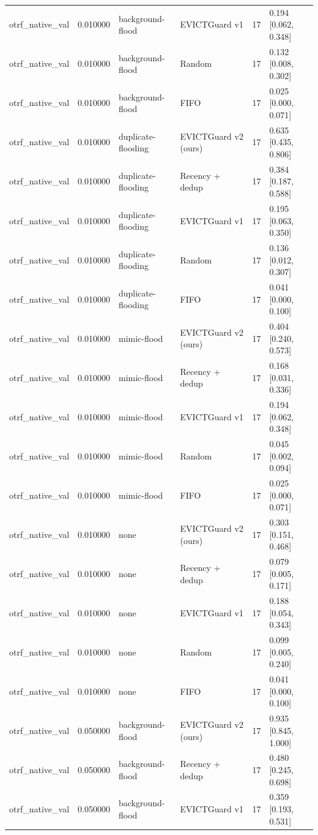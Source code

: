 \begin{tabular}{lrllrl}
otrf\_native\_val & 0.010000 & background-flood & EVICTGuard v1 & 17 & 0.194 [0.062, 0.348] \\
otrf\_native\_val & 0.010000 & background-flood & Random & 17 & 0.132 [0.008, 0.302] \\
otrf\_native\_val & 0.010000 & background-flood & FIFO & 17 & 0.025 [0.000, 0.071] \\
otrf\_native\_val & 0.010000 & duplicate-flooding & EVICTGuard v2 (ours) & 17 & 0.635 [0.435, 0.806] \\
otrf\_native\_val & 0.010000 & duplicate-flooding & Recency + dedup & 17 & 0.384 [0.187, 0.588] \\
otrf\_native\_val & 0.010000 & duplicate-flooding & EVICTGuard v1 & 17 & 0.195 [0.063, 0.350] \\
otrf\_native\_val & 0.010000 & duplicate-flooding & Random & 17 & 0.136 [0.012, 0.307] \\
otrf\_native\_val & 0.010000 & duplicate-flooding & FIFO & 17 & 0.041 [0.000, 0.100] \\
otrf\_native\_val & 0.010000 & mimic-flood & EVICTGuard v2 (ours) & 17 & 0.404 [0.240, 0.573] \\
otrf\_native\_val & 0.010000 & mimic-flood & Recency + dedup & 17 & 0.168 [0.031, 0.336] \\
otrf\_native\_val & 0.010000 & mimic-flood & EVICTGuard v1 & 17 & 0.194 [0.062, 0.348] \\
otrf\_native\_val & 0.010000 & mimic-flood & Random & 17 & 0.045 [0.002, 0.094] \\
otrf\_native\_val & 0.010000 & mimic-flood & FIFO & 17 & 0.025 [0.000, 0.071] \\
otrf\_native\_val & 0.010000 & none & EVICTGuard v2 (ours) & 17 & 0.303 [0.151, 0.468] \\
otrf\_native\_val & 0.010000 & none & Recency + dedup & 17 & 0.079 [0.005, 0.171] \\
otrf\_native\_val & 0.010000 & none & EVICTGuard v1 & 17 & 0.188 [0.054, 0.343] \\
otrf\_native\_val & 0.010000 & none & Random & 17 & 0.099 [0.005, 0.240] \\
otrf\_native\_val & 0.010000 & none & FIFO & 17 & 0.041 [0.000, 0.100] \\
otrf\_native\_val & 0.050000 & background-flood & EVICTGuard v2 (ours) & 17 & 0.935 [0.845, 1.000] \\
otrf\_native\_val & 0.050000 & background-flood & Recency + dedup & 17 & 0.480 [0.245, 0.698] \\
otrf\_native\_val & 0.050000 & background-flood & EVICTGuard v1 & 17 & 0.359 [0.193, 0.531] \\

\end{tabular}
